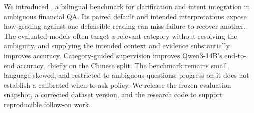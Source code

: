 We introduced \fininteract, a bilingual benchmark for clarification and intent integration in ambiguous financial QA. Its paired default and intended interpretations expose how grading against one defensible reading can miss failure to recover another. The evaluated models often target a relevant category without resolving the ambiguity, and supplying the intended context and evidence substantially improves accuracy. Category-guided supervision improves Qwen3-14B's end-to-end accuracy, chiefly on the Chinese split. The benchmark remains small, language-skewed, and restricted to ambiguous questions; progress on it does not establish a calibrated when-to-ask policy. We release the frozen evaluation snapshot, a corrected dataset version, and the research code to support reproducible follow-on work.
